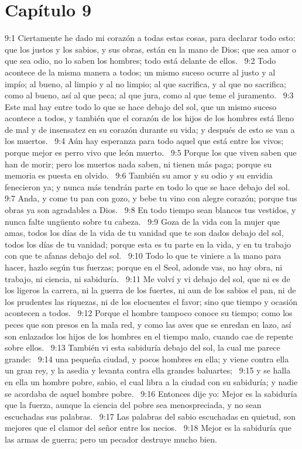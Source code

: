 \section*{Capítulo 9}
9:1 Ciertamente he dado mi corazón a todas estas cosas, para declarar todo esto: que los justos y los sabios, y sus obras, están en la mano de Dios; que sea amor o que sea odio, no lo saben los hombres; todo está delante de ellos.  
9:2 Todo acontece de la misma manera a todos; un mismo suceso ocurre al justo y al impío; al bueno, al limpio y al no limpio; al que sacrifica, y al que no sacrifica; como al bueno, así al que peca; al que jura, como al que teme el juramento.  
9:3 Este mal hay entre todo lo que se hace debajo del sol, que un mismo suceso acontece a todos, y también que el corazón de los hijos de los hombres está lleno de mal y de insensatez en su corazón durante su vida; y después de esto se van a los muertos.  
9:4 Aún hay esperanza para todo aquel que está entre los vivos; porque mejor es perro vivo que león muerto.  
9:5 Porque los que viven saben que han de morir; pero los muertos nada saben, ni tienen más paga; porque su memoria es puesta en olvido.  
9:6 También su amor y su odio y su envidia fenecieron ya; y nunca más tendrán parte en todo lo que se hace debajo del sol.  
9:7 Anda, y come tu pan con gozo, y bebe tu vino con alegre corazón; porque tus obras ya son agradables a Dios.  
9:8 En todo tiempo sean blancos tus vestidos, y nunca falte ungüento sobre tu cabeza.  
9:9 Goza de la vida con la mujer que amas, todos los días de la vida de tu vanidad que te son dados debajo del sol, todos los días de tu vanidad; porque esta es tu parte en la vida, y en tu trabajo con que te afanas debajo del sol.  
9:10 Todo lo que te viniere a la mano para hacer, hazlo según tus fuerzas; porque en el Seol, adonde vas, no hay obra, ni trabajo, ni ciencia, ni sabiduría.  
9:11 Me volví y vi debajo del sol, que ni es de los ligeros la carrera, ni la guerra de los fuertes, ni aun de los sabios el pan, ni de los prudentes las riquezas, ni de los elocuentes el favor; sino que tiempo y ocasión acontecen a todos.  
9:12 Porque el hombre tampoco conoce su tiempo; como los peces que son presos en la mala red, y como las aves que se enredan en lazo, así son enlazados los hijos de los hombres en el tiempo malo, cuando cae de repente sobre ellos.  
9:13 También vi esta sabiduría debajo del sol, la cual me parece grande:  
9:14 una pequeña ciudad, y pocos hombres en ella; y viene contra ella un gran rey, y la asedia y levanta contra ella grandes baluartes;  
9:15 y se halla en ella un hombre pobre, sabio, el cual libra a la ciudad con su sabiduría; y nadie se acordaba de aquel hombre pobre.  
9:16 Entonces dije yo: Mejor es la sabiduría que la fuerza, aunque la ciencia del pobre sea menospreciada, y no sean escuchadas sus palabras.  
9:17 Las palabras del sabio escuchadas en quietud, son mejores que el clamor del señor entre los necios.  
9:18 Mejor es la sabiduría que las armas de guerra; pero un pecador destruye mucho bien.  

